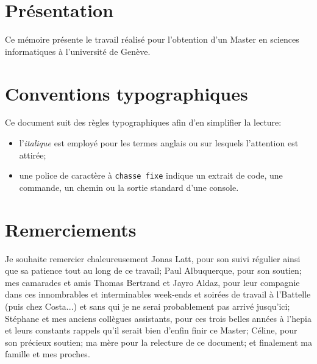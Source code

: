 \section*{Présentation}
Ce mémoire présente le travail réalisé pour l'obtention d'un Master en sciences informatiques à l'université de Genève.


\section*{Conventions typographiques}\label{title-avantpropos}

\noindent Ce document suit des règles typographiques afin d'en simplifier la lecture:

\begin{itemize}
\item l'\textit{italique} est employé pour les termes anglais ou sur lesquels l'attention est attirée;
\item une police de caractère à \texttt{chasse fixe} indique un extrait de code, une commande, un chemin ou la sortie standard d'une console.
\end{itemize}

\section*{Remerciements}
Je souhaite remercier chaleureusement Jonas Latt, pour son suivi régulier ainsi que sa patience tout au long de ce travail; Paul Albuquerque, pour son soutien; mes camarades et amis Thomas Bertrand et Jayro Aldaz, pour leur compagnie dans ces innombrables et interminables week-ends et soirées de travail à l'Battelle (puis chez Costa...) et sans qui je ne serai probablement pas arrivé jusqu'ici; Stéphane et mes anciens collègues assistants, pour ces trois belles années à l'hepia et leurs constants rappels qu'il serait bien d'enfin finir ce Master; Céline, pour son précieux soutien; ma mère pour la relecture de ce document; et finalement ma famille et mes proches.

